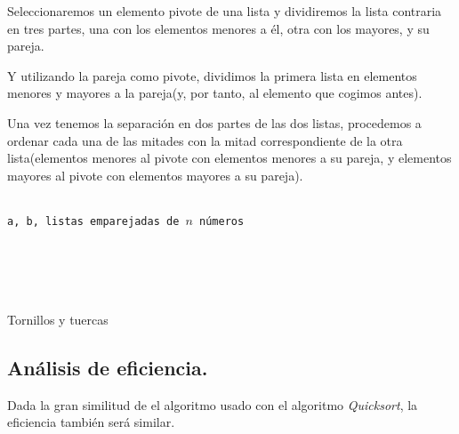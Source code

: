 \documentclass[a4paper, 11pt]{article} %
\begin{document}
    Seleccionaremos un elemento pivote de una lista y dividiremos la lista contraria en tres partes, una con los elementos menores a él, otra con los mayores, y su pareja.
    
    Y utilizando la pareja como pivote, dividimos la primera lista en elementos menores y mayores a la pareja(y, por tanto, al elemento que cogimos antes).
    
    Una vez tenemos la separación en dos partes de las dos listas, procedemos a ordenar cada una de las mitades con la mitad correspondiente de la otra lista(elementos menores al pivote con elementos menores a su pareja, y elementos mayores al pivote con elementos mayores a su pareja).
\begin{algorithm}[H]
	\begin{algorithmic}[1]
	  \REQUIRE \ \\
	    \texttt{a, b, listas emparejadas de $n$ números}\\
	    \RETURN {\texttt{[]}}
	  \ELSE
	  \ENDIF \\
	  \ENDIF \\
	  
	  \ENDIF \\\
	\end{algorithmic}
    \caption{Tornillos y tuercas}
    \label{TyT}
\end{algorithm}
  \subsection{Análisis de eficiencia.}
      Dada la gran similitud de el algoritmo usado con el algoritmo \textit{Quicksort}, la eficiencia también será similar.
      
\end{document}
